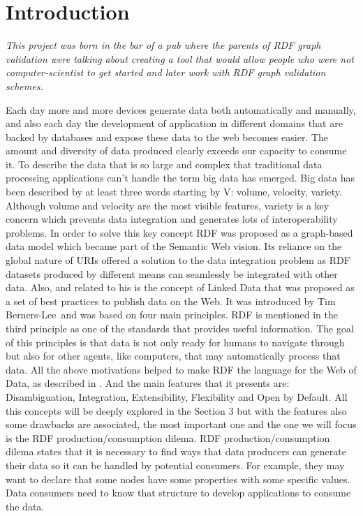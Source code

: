 \setchapterpreamble[u]{\margintoc}
\chapter{Introduction}

\textit{This project was born in the bar of a pub where the parents of RDF graph validation were talking about creating a tool that would allow people who were not computer-scientist to get started and later work with RDF graph validation schemes.}

Each day more and more devices generate data both automatically and manually, and also each day the development of application in different domains that are backed by databases and expose these data to the web becomes easier. The amount and diversity of data produced clearly exceeds our capacity to consume it.
To describe the data that is so large and complex that traditional data processing applications can’t handle the term big data has emerged. Big data has been described by at least three words starting by V: volume, velocity, variety. Although volume and velocity are the most visible features, variety is a key concern which prevents data integration and generates lots of interoperability problems.
In order to solve this key concept RDF was proposed as a graph-based data model which became part of the Semantic Web vision. Its reliance on the global nature of URIs offered a solution to the data integration problem as RDF datasets produced by different means can seamlessly be integrated with other data.
Also, and related to his is the concept of Linked Data  that was proposed as a set of best practices to publish data on the Web. It was introduced by Tim Berners-Lee and was based on four main principles. RDF is mentioned in the third principle as one of the standards that provides useful information. The goal of this principles is that data is not only ready for humans to navigate through but also for other agents, like computers, that may automatically process that data.
All the above motivations helped to make RDF the language for the Web of Data, as described in . And the main features that it presents are: Disambiguation, Integration, Extensibility, Flexibility and Open by Default. All this concepts will be deeply explored in the Section 3 but with the features also some drawbacks are associated, the most important one and the one we will focus is the RDF production/consumption dilema.
RDF production/consumption dilema states that it is necessary to find ways that data producers can generate their data so it can be handled by potential consumers. For example, they may want to declare that some nodes have some properties with some specific values. Data consumers need to know that structure to develop applications to consume the data.
